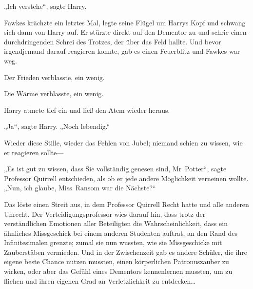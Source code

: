 „Ich verstehe“, sagte Harry.

Fawkes krächzte ein letztes Mal, legte seine Flügel um Harrys Kopf und schwang sich dann von Harry auf. Er stürzte direkt auf den Dementor zu und schrie einen durchdringenden Schrei des Trotzes, der über das Feld hallte. Und bevor irgendjemand darauf reagieren konnte, gab es einen Feuerblitz und Fawkes war weg.

Der Frieden verblasste, ein wenig.

Die Wärme verblasste, ein wenig.

Harry atmete tief ein und ließ den Atem wieder heraus.

„Ja“, sagte Harry. „Noch lebendig.“

Wieder diese Stille, wieder das Fehlen von Jubel; niemand schien zu wissen, wie er reagieren sollte—

„Es ist gut zu wissen, dass Sie vollständig genesen sind, Mr~Potter“, sagte Professor Quirrell entschieden, als ob er jede andere Möglichkeit verneinen wollte. „Nun, ich glaube, Miss~Ransom war die Nächste?“

Das löste einen Streit aus, in dem Professor Quirrell Recht hatte und alle anderen Unrecht. Der Verteidigungsprofessor wies darauf hin, dass trotz der verständlichen Emotionen aller Beteiligten die Wahrscheinlichkeit, dass ein ähnliches Missgeschick bei einem anderen Studenten auftrat, an den Rand des Infinitesimalen grenzte; zumal sie nun wussten, wie sie Missgeschicke mit Zauberstäben vermieden. Und in der Zwischenzeit gab es andere Schüler, die ihre eigene beste Chance nutzen mussten, einen körperlichen Patronuszauber zu wirken, oder aber das Gefühl eines Dementors kennenlernen mussten, um zu fliehen und ihren eigenen Grad an Verletzlichkeit zu entdecken…

